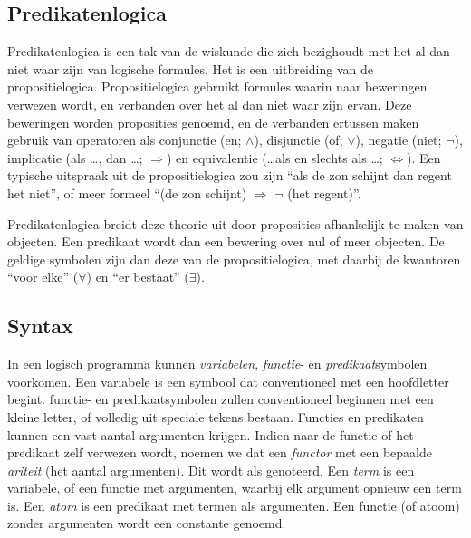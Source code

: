 \subsection{Predikatenlogica}

Predikatenlogica is een tak van de wiskunde die zich bezighoudt met het al dan niet waar zijn van logische formules. Het is een uitbreiding van de propositielogica. Propositielogica gebruikt formules waarin naar beweringen verwezen wordt, en verbanden over het al dan niet waar zijn ervan. Deze beweringen worden proposities genoemd, en de verbanden ertussen maken gebruik van operatoren als conjunctie (en; $\land$), disjunctie (of; $\lor$), negatie (niet; $\lnot$), implicatie (als \ldots, dan \ldots; $\Rightarrow$) en equivalentie (\ldots als en slechts als \ldots; $\Leftrightarrow$). Een typische uitspraak uit de propositielogica zou zijn ``als de zon schijnt dan regent het niet'', of meer formeel ``(de zon schijnt) $\Rightarrow$ $\lnot$ (het regent)''.

Predikatenlogica breidt deze theorie uit door proposities afhankelijk te maken van objecten. Een predikaat wordt dan een bewering over nul of meer objecten. De geldige symbolen zijn dan deze van de propositielogica, met daarbij de kwantoren ``voor elke'' ($\forall$) en ``er bestaat'' ($\exists$).

\subsection{Syntax}

In een logisch programma kunnen {\em variabelen}, {\em functie}- en {\em predikaat}symbolen voorkomen. Een variabele is een symbool dat conventioneel met een hoofdletter begint. functie- en predikaatsymbolen zullen conventioneel beginnen met een kleine letter, of volledig uit speciale tekens bestaan. Functies en predikaten kunnen een vast aantal argumenten krijgen. Indien naar de functie of het predikaat zelf verwezen wordt, noemen we dat een {\em functor} met een bepaalde {\em ariteit} (het aantal argumenten). Dit wordt als  genoteerd. Een {\em term} is een variabele, of een functie met argumenten, waarbij elk argument opnieuw een term is. Een {\em atom} is een predikaat met termen als argumenten. Een functie (of atoom) zonder argumenten wordt een constante genoemd.

